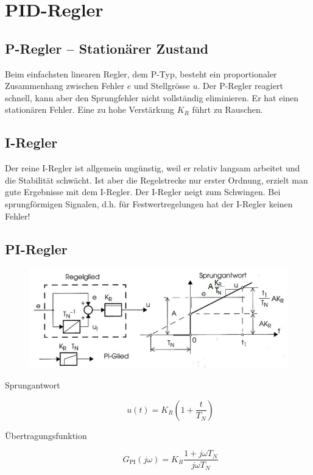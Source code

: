 \section{PID-Regler }

\subsection{P-Regler -- Stationärer Zustand }
Beim einfachsten linearen Regler, dem P-Typ, besteht ein proportionaler Zusammenhang zwischen Fehler $e$ und Stellgrösse $u$.
Der P-Regler reagiert schnell, kann aber den Sprungfehler nicht vollständig eliminieren.
Er hat einen stationären Fehler.
Eine zu hohe Verstärkung $K_R$ führt zu Rauschen.


\subsection{I-Regler }
Der reine I-Regler ist allgemein ungünstig, weil er relativ langsam arbeitet und die Stabilität schwächt. Ist aber die Regelstrecke nur erster Ordnung, erzielt man gute Ergebnisse mit dem I-Regler.
Der I-Regler neigt zum Schwingen.
Bei sprungförmigen Signalen, d.h. für Festwertregelungen hat der I-Regler keinen Fehler!


\subsection{PI-Regler }
\begin{figure}[h!]
	\includegraphics[width=\linewidth]{./images/PI_Regler.jpg}
\end{figure}
\begin{description}
	\item[Sprungantwort]
		\[
			u(t) = K_R\left( 1 + \frac{t}{T_N}\right)
		\]
	\item[\"Ubertragungsfunktion]
		\[
			G_\text{PI}(j\omega) = K_R \frac{1+j\omega T_N}{j\omega T_N}
		\]
\end{description}


